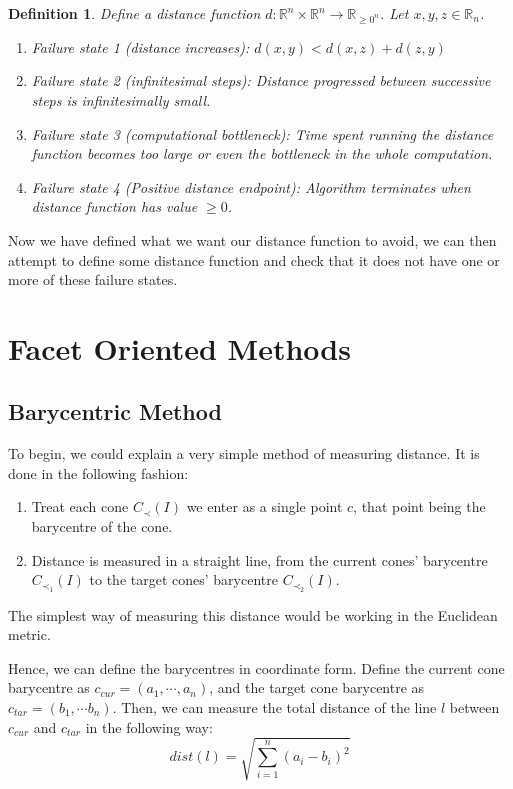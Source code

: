 \documentclass[12pt,a4paper]{report}
\newtheorem{definition}[theorem]{Definition}
\begin{document}
\begin{definition}
Define a distance function $d : \mathbb R^{n} \times \mathbb R^{n} \rightarrow \mathbb R_{{\geq 0}^{n}}$.  Let $x, y, z \in \mathbb R_{n}$.

\begin{enumerate}
    \item Failure state 1 (distance increases): $d(x,y) < d(x,z) + d(z,y)$ 
    \item Failure state 2 (infinitesimal steps): Distance progressed between successive steps is infinitesimally small.
    \item Failure state 3 (computational bottleneck):  Time spent running the distance function becomes too large or even the bottleneck in the whole computation.
    \item Failure state 4 (Positive distance endpoint): Algorithm terminates when distance function has value $\geq 0$.
\end{enumerate}
\end{definition}

Now we have defined what we want our distance function to avoid, we can then attempt to define some distance function and check that it does not have one or more of these failure states.

\section{Facet Oriented Methods}

\subsection{Barycentric Method}
To begin, we could explain a very simple method of measuring distance. It is done in the following fashion:

\begin{enumerate}
    \item Treat each cone $C_{\prec} (I)$ we enter as a single point $c$, that point being the barycentre of the cone.
    \item Distance is measured in a straight line, from the current cones' barycentre $C_{\prec_{1}} (I)$  to the target cones' barycentre $C_{\prec_{2}} (I)$.
\end{enumerate}
The simplest way of measuring this distance would be working in the Euclidean metric.

Hence, we can define the barycentres in coordinate form. Define the current cone barycentre as $c_{cur} = (a_{1}, \cdots, a_{n})$, and the target cone barycentre as $c_{tar} = (b_{1}, \cdots b_{n})$. Then, we can measure the total distance of the line $l$ between $c_{cur}$ and $c_{tar}$ in the following way:
\begin{equation*}
    dist(l) = \sqrt{\sum_{i=1}^{n} (a_{i} - b_{i})^{2}}
\end{equation*}
\end{document}
